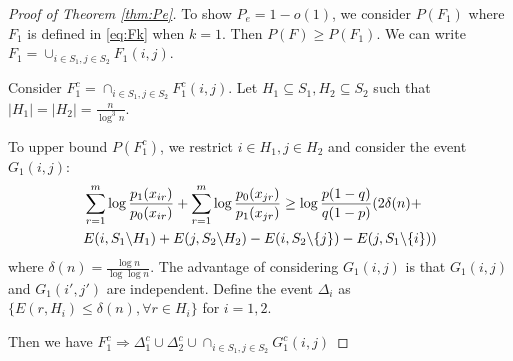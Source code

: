 \documentclass[conference]{IEEEtran}
\begin{document}
\begin{proof}[Proof of Theorem \ref{thm:Pe}]
To show $P_e = 1 - o(1)$, we consider $P(F_1)$ where
$F_1$ is defined in \eqref{eq:Fk} when $k=1$.
Then $P(F) \geq P(F_1)$. We can write $F_1 = \cup_{i \in S_1,j \in S_2}F_1(i,j)$.

Consider $F_1^c = \cap_{i\in S_1, j\in S_2} F_1^c(i,j)$.
Let $H_1\subseteq S_1, H_2 \subseteq S_2$ such that $|H_1| = |H_2| = \frac{n}{\log^3 n}$.

To upper bound $P(F_1^c)$, we restrict $i \in H_1, j \in H_2$ and consider the event
$G_1(i,j)$:
\begin{align}
&\sum_{r=1}^{m} \log \frac{p_1(x_{ir})}{p_0(x_{ir})}
+\sum_{r=1}^{m} \log \frac{p_0(x_{jr})}{p_1(x_{jr})}
\geq\log \frac{p(1-q)}{q(1-p)} (2\delta(n) + \notag\\
& E(i, S_1 \backslash H_1) + E(j, S_2 \backslash H_2)
- E(i, S_2 \backslash \{j\}) - E(j, S_1 \backslash \{i\})) \label{eq:G1ij}
\end{align}
where $\delta(n) = \frac{\log n}{\log \log n}$.
The advantage of considering $G_1(i,j)$ is that $G_1(i,j)$ and $G_1(i', j')$ are independent.
Define the event $\Delta_i$ as $\{E(r, H_i) \leq \delta(n), \forall r\in H_i \}$ for $i=1,2$.

Then we have $F_1^c \Rightarrow \Delta_1^c \cup \Delta_2^c \cup \cap_{i\in S_1, j\in S_2}G^c_1(i,j)$


\end{proof}
\end{document}
